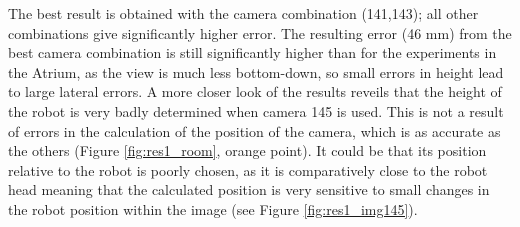 The best result is obtained with the camera combination (141,143); all other combinations give significantly higher error.
The resulting error (46 mm) from the best camera combination is still significantly higher than for the experiments in the Atrium, as the view is much less bottom-down, so small errors in height lead to large lateral errors.
A more closer look of the results reveils that the height of the robot is very badly determined when camera 145 is used. This is not a result of errors in the calculation of the position of the camera, which is as accurate as the others (Figure \ref{fig:res1_room}, orange point). 
It could be that its position relative to the robot is poorly chosen, as it is comparatively close to the robot head meaning that the calculated position is very sensitive to small changes in the robot position within the image (see Figure \ref{fig:res1_img145}).

